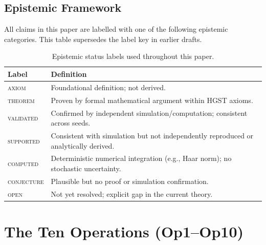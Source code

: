 \documentclass[12pt,a4paper]{article}
\theoremstyle{plain}
\theoremstyle{definition}
\theoremstyle{remark}
\begin{document}
\subsection*{Epistemic Framework}
\label{sec:epistemic-framework}

All claims in this paper are labelled with one of the following epistemic
categories. This table supersedes the label key in earlier drafts.

\begin{table}[htbp]
\caption{Epistemic status labels used throughout this paper.}
\label{tab:epistemic-labels}
\small
\begin{tabular}{lp{9cm}}
\toprule
Label & Definition \\
\midrule
\textsc{axiom} & Foundational definition; not derived. \\
\textsc{theorem} & Proven by formal mathematical argument within HGST axioms. \\
\textsc{validated} & Confirmed by independent simulation/computation; consistent across seeds. \\
\textsc{supported} & Consistent with simulation but not independently reproduced or analytically derived. \\
\textsc{computed} & Deterministic numerical integration (e.g., Haar norm); no stochastic uncertainty. \\
\textsc{conjecture} & Plausible but no proof or simulation confirmation. \\
\textsc{open} & Not yet resolved; explicit gap in the current theory. \\
\bottomrule
\end{tabular}
\end{table}

\section{The Ten Operations (Op1--Op10)}
\label{sec:ops}
\end{document}
